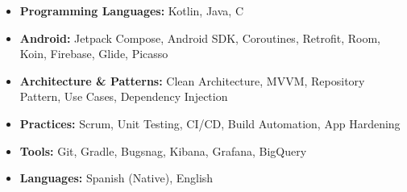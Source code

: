 \documentclass[11pt,a4paper]{article}
\begin{document}
\begin{itemize}[leftmargin=*]
    \item \textbf{Programming Languages:} Kotlin, Java, C
    \item \textbf{Android:} Jetpack Compose, Android SDK, Coroutines, Retrofit, Room, Koin, Firebase, Glide, Picasso
    \item \textbf{Architecture \& Patterns:} Clean Architecture, MVVM, Repository Pattern, Use Cases, Dependency Injection
    \item \textbf{Practices:} Scrum, Unit Testing, CI/CD, Build Automation, App Hardening
    \item \textbf{Tools:} Git, Gradle, Bugsnag, Kibana, Grafana, BigQuery
    \item \textbf{Languages:} Spanish (Native), English
\end{itemize}
\end{document}
